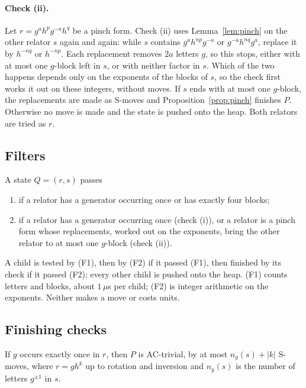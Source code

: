 \paragraph{Check (ii).} Let $r=g^ah^pg^{-a}h^q$ be a pinch form. Check (ii) uses Lemma~\ref{lem:pinch} on the other
relator $s$ again and again: while $s$ contains $g^ah^{np}g^{-a}$ or $g^{-a}h^{nq}g^a$, replace it by $h^{-nq}$ or
$h^{-np}$. Each replacement removes $2a$ letters $g$, so this stops, either with at most one $g$-block left in $s$, or
with neither factor in $s$. Which of the two happens depends only on the exponents of the blocks of $s$, so the check
first works it out on these integers, without moves. If $s$ ends with at most one $g$-block, the replacements are
made as S-moves and Proposition~\ref{prop:pinch} finishes $P$. Otherwise no move is made and the state is pushed onto
the heap. Both relators are tried as $r$.

\subsection{Filters}

\begin{definition}[Filters]\label{def:filters}
A state $Q=(r,s)$ passes
\begin{enumerate}
  \item[(F1)] if a relator has a generator occurring once or has exactly four blocks;
  \item[(F2)] if a relator has a generator occurring once (check (i)), or a relator is a pinch form whose
  replacements, worked out on the exponents, bring the other relator to at most one $g$-block (check (ii)).
\end{enumerate}
\end{definition}

A child is tested by (F1), then by (F2) if it passed (F1), then finished by its check if it passed (F2); every other
child is pushed onto the heap. (F1) counts letters and blocks, about $1\,\mu$s per child; (F2) is integer arithmetic
on the exponents. Neither makes a move or costs units.

\subsection{Finishing checks}

\begin{proposition}\label{prop:once}
If $g$ occurs exactly once in $r$, then $P$ is AC-trivial, by at most $n_g(s)+|k|$ S-moves, where $r=gh^k$ up to
rotation and inversion and $n_g(s)$ is the number of letters $g^{\pm1}$ in $s$.
\end{proposition}

